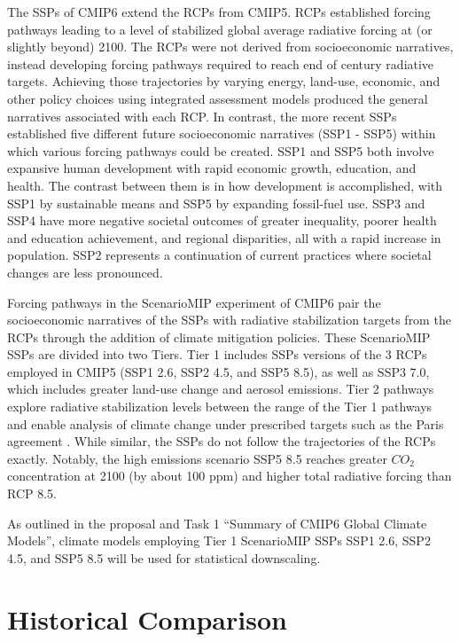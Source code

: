 \documentclass[]{scrartcl}
\begin{document}
The SSPs of CMIP6 extend the RCPs from CMIP5. RCPs established forcing pathways leading to a level of stabilized global average radiative forcing at (or slightly beyond) 2100. The RCPs were not derived from socioeconomic narratives, instead developing forcing pathways required to reach end of century radiative targets. Achieving those trajectories by varying energy, land-use, economic, and other policy choices using integrated assessment models produced the general narratives associated with each RCP. In contrast, the more recent SSPs established five different future socioeconomic narratives (SSP1 - SSP5) within which various forcing pathways could be created. SSP1 and SSP5 both involve expansive human development with rapid economic growth, education, and health. The contrast between them is in how development is accomplished, with SSP1 by sustainable means and SSP5 by expanding fossil-fuel use. SSP3 and SSP4 have more negative societal outcomes of greater inequality, poorer health and education achievement, and regional disparities, all with a rapid increase in population. SSP2 represents a continuation of current practices where societal changes are less pronounced. 

Forcing pathways in the ScenarioMIP experiment of CMIP6 pair the socioeconomic narratives of the SSPs with radiative stabilization targets from the RCPs through the addition of climate mitigation policies. These ScenarioMIP SSPs are divided into two Tiers. Tier 1 includes SSPs versions of the 3 RCPs employed in CMIP5 (SSP1 2.6, SSP2 4.5, and SSP5 8.5), as well as SSP3 7.0, which includes greater land-use change and aerosol emissions. Tier 2 pathways explore radiative stabilization levels between the range of the Tier 1 pathways and enable analysis of climate change under prescribed targets such as the Paris agreement \citep{oneill_scenario_2016}. While similar, the SSPs do not follow the trajectories of the RCPs exactly. Notably, the high emissions scenario SSP5 8.5 reaches greater $CO_2$ concentration at 2100 (by about 100 ppm) and higher total radiative forcing than RCP 8.5. 

As outlined in the proposal and Task 1 ``Summary of CMIP6 Global Climate Models'', climate models employing Tier 1 ScenarioMIP SSPs SSP1 2.6, SSP2 4.5, and SSP5 8.5 will be used for statistical downscaling. 


\section{Historical Comparison}
\end{document}
